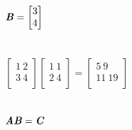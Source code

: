 \documentclass[12pt]{minimal}
\begin{document}
$
\textbf{\textit{B}} = 
\begin{bmatrix}
    3\\ 4\\
\end{bmatrix} 
$ \\ \\ \\

$
\begin{bmatrix}
    1\ 2\\
    3\ 4\\
\end{bmatrix}
\begin{bmatrix}
    1\ 1\\
    2\ 4\\
\end{bmatrix} = 
\begin{bmatrix}
    5\ 9\\
    11\ 19\\
\end{bmatrix}
$ \\ \\ \\

$
\textbf{\textit{A}}\textbf{\textit{B}}=\textbf{\textit{C}} 
$ \\ \\ \\ 
\end{document}

